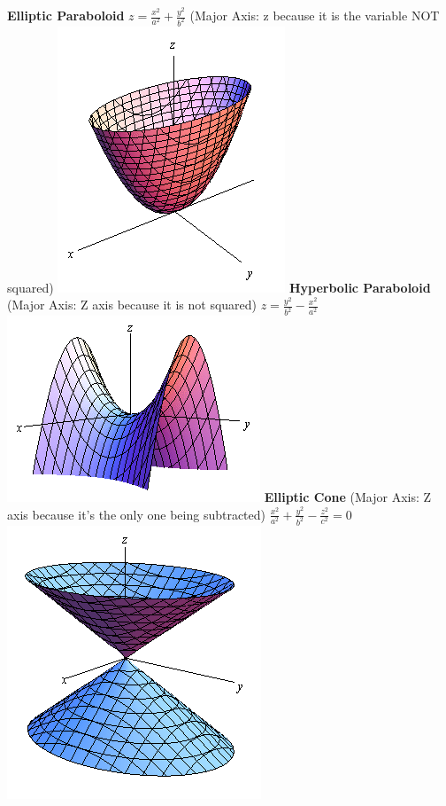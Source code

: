 \documentclass[10pt,landscape]{article}
\begin{document}
\begin{multicols*}{5}
\textbf{Elliptic Paraboloid}\newline
$ z=\frac{x^2}{a^2}+\frac{y^2}{b^2} $\newline
(Major Axis: z because it is the variable NOT squared)\newline
\includegraphics[scale=0.15]{elliptic_paraboloid}\newline
\textbf{Hyperbolic Paraboloid}\newline
(Major Axis: Z axis because it is not squared)\newline
$ z=\frac{y^2}{b^2}-\frac{x^2}{a^2} $\newline
\includegraphics[scale=0.15]{hyperbolic_paraboloid}\newline
\textbf{Elliptic Cone}\newline
(Major Axis: Z axis because it's the only one being subtracted)\newline
$ \frac{x^2}{a^2}+\frac{y^2}{b^2}-\frac{z^2}{c^2} = 0 $\newline
\includegraphics[scale=0.15]{elliptic_cone}\newline

\end{multicols*}
\end{document}
